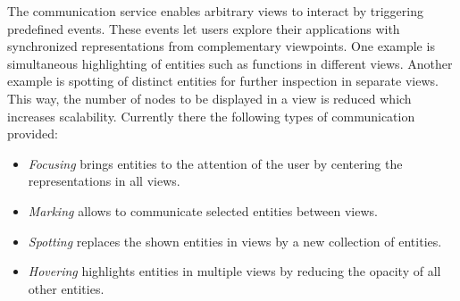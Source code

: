 The communication service enables arbitrary views to interact by triggering
predefined events. These events let users explore their applications with
synchronized representations from complementary viewpoints. One example is
simultaneous highlighting of entities such as functions in different views.
Another example is spotting of distinct entities for further inspection in
separate views. This way, the number of nodes to be displayed in a view is
reduced which increases scalability. Currently there the following types of
communication provided:

\begin{itemize}
	\item \textit{Focusing} brings entities to the attention of the user by
centering the representations in all views.
	\item \textit{Marking} allows to communicate selected entities between views.
	\item \textit{Spotting} replaces the shown entities in views by a new
collection of entities.
	\item \textit{Hovering} highlights entities in multiple views by reducing the
opacity of all other entities.
\end{itemize}